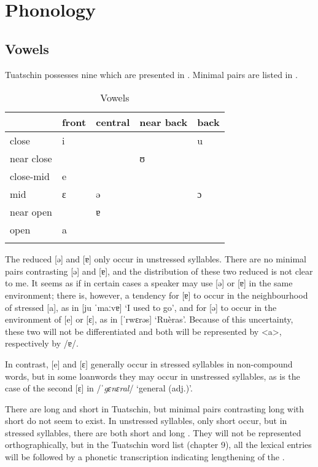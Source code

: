 \chapter{Phonology}

\section{Vowels}\label{sec:2.1}
Tuatschin possesses nine  which are presented in . Minimal pairs are listed in .
\begin{table}
\caption{Vowels}
\label{vow}
 \begin{tabular}{lllll}
  \lsptoprule
            &  front& central  & near back & back \\
  \midrule
 close   &  i  &      &   &    u \\
 near close    &   &      & ʊ  &  \\
close-mid    &  e  &   &  &       \\
mid    & ɛ   & ə  &        & ɔ \\
near open    &    &  ɐ   &        \\
open    &   a  & \\
  \lspbottomrule
 \end{tabular}
\end{table}

The reduced  [ə] and [ɐ] only occur in unstressed syllables. There are no minimal pairs contrasting [ə] and [ɐ], and the distribution of these two reduced  is not clear to me. It seems as if in certain cases a speaker may use [ə] or [ɐ] in the same environment; there is, however, a tendency for [ɐ] to occur in the neighbourhood of stressed [a], as in [ju ˈmaːvɐ] `I used to go', and for [ə] to occur in the environment of [e] or [ɛ], as in [ˈrwɛrəs] `Ruèras'. Because of this uncertainty, these two  will not be differentiated and both will be represented by <a>, respectively by /ɐ/.

In contrast, [e] and [ɛ] generally occur in stressed syllables in non-compound words, but in some loanwords they may occur in unstressed syllables, as is the case of the second [ɛ] in /\textit{ˈgɛnɛral}/ `general (adj.)'.

There are long and short  in Tuatschin, but minimal pairs contrasting long  with short  do not seem to exist. In unstressed syllables, only short  occur, but in stressed syllables, there are both short and long . They will not be represented orthographically, but in the Tuatschin word list (chapter 9), all the lexical entries will be followed by a phonetic transcription indicating lengthening of the .

